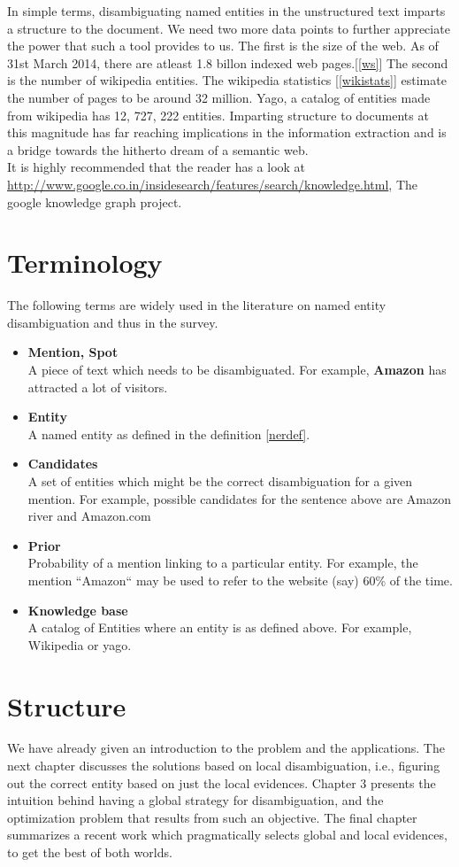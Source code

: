 In simple terms, disambiguating named entities in the unstructured text imparts a structure to the document. 
We need two more data points to further appreciate the power that such a tool provides to us.
The first is the size of the web. As of 31st March 2014, there are atleast 1.8 billon indexed web pages.[\ref{ws}]
The second is the number of wikipedia entities. The wikipedia statistics [\ref{wikistats}] estimate the number of pages to be
around 32 million. Yago, a catalog of entities made from wikipedia has 12, 727, 222 entities.	
Imparting structure to documents at this magnitude has far reaching implications in the information
extraction and is a bridge towards the hitherto dream of a semantic web.  \\


It is highly recommended that the reader has a look at \url{http://www.google.co.in/insidesearch/features/search/knowledge.html}, 
The google knowledge graph project.


\section{Terminology}
The following terms are widely used in the literature on named entity disambiguation and thus in the survey.

\begin{itemize}
 \item \textbf{Mention, Spot} \\
 A piece of text which needs to be disambiguated. For example, \textbf{Amazon} has attracted a lot of visitors.
 \item \textbf{Entity} \\
 A named entity as defined in the definition \ref{nerdef}. 
 \item \textbf{Candidates} \\
 A set of entities which might be the correct disambiguation for a given mention.
 For example, possible candidates for the sentence above are Amazon river and Amazon.com
 \item \textbf{Prior} \\
 Probability of a mention linking to a particular entity. For example, the mention ``Amazon`` may be used
 to refer to the website (say) 60\% of the time.
 \item \textbf{Knowledge base} \\
 A catalog of Entities where an entity is as defined above. For example, Wikipedia or yago.

\end{itemize}

\section{Structure}
We have already given an introduction to the problem and the applications. 
The next chapter discusses the solutions based on local disambiguation, i.e., figuring 
out the correct entity based on just the local evidences. Chapter 3 presents the intuition
behind having a global strategy for disambiguation, and the optimization problem that
results from such an objective. The final chapter summarizes a recent work which 
pragmatically selects global and local evidences, to get the best of both worlds.
